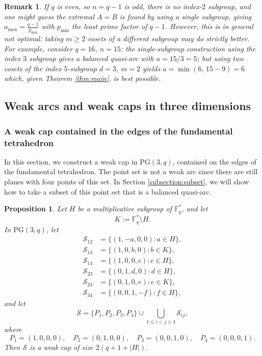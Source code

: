 \documentclass{article}
\newtheorem{proposition}{Proposition}
\newtheorem{remark}{Remark}
\newcommand{\PG}{\mathrm{PG}}
\newcommand{\F}{\mathbb{F}}
\begin{document}
\begin{remark}
If $q$ is even, so $n=q-1$ is odd, there is no index-$2$ subgroup, and one might guess the extremal $A=B$ is found by using a single subgroup, giving $a_{\max}=\frac{q-1}{p_{\min}}$ with
$p_{\min}$ the least prime factor of $q-1$. However, this is in general not optimal: taking $m\ge 2$
cosets of a different subgroup may do strictly better. For example, consider $q=16$, $n=15$: the single-subgroup construction using the index $3$ subgroup gives a balanced quasi-arc with $a=15/3=5$; but using two cosets of the index $5$-subgroup $d=3$, $m=2$
  yields $a=\min(6,\,15-9)=6$ which, given Theorem \ref{thm:main}, is best possible.
\end{remark}






\subsection{Weak arcs and weak caps in three dimensions}\label{subs:higher}
\subsubsection{A weak cap contained in the edges of the fundamental tetrahedron}
In this section, we construct a weak cap in $\PG(3,q)$, contained on the edges of the fundamental tetrahedron. The point set is not a weak arc since there are still planes with four points of this set. In Section \ref{subsection:subset}, we will show how to take a subset of this point set that is a balanced quasi-arc.


\begin{proposition}\label{prop:cap}
Let $H$ be a multiplicative 
subgroup of $\F_q^*$, and let
\[
K:=\F_q^*\setminus H.
\]
In $\PG(3,q)$, let
\[
\begin{aligned}
\mathcal S_{12}&=\{(1,-a,0,0):a\in H\},\\
\mathcal S_{13}&=\{(1,0,b,0):b\in K\},\\
\mathcal S_{14}&=\{(1,0,0,c):c\in H\},\\
\mathcal S_{23}&=\{(0,1,d,0):d\in H\},\\
\mathcal S_{24}&=\{(0,1,0,e):e\in K\},\\
\mathcal S_{34}&=\{(0,0,1,-f):f\in H\},
\end{aligned}
\]
and let
\[
\mathcal S=
\{P_1,P_2,P_3,P_4\}
\cup
\bigcup_{1\le i<j\le 4}\mathcal S_{ij},
\]
where
\[
P_1=(1,0,0,0),\quad
P_2=(0,1,0,0),\quad
P_3=(0,0,1,0),\quad
P_4=(0,0,0,1).
\]
Then  $\mathcal S$ is a weak cap of size $2(q+1+|H|).$
\end{proposition}
\end{document}
